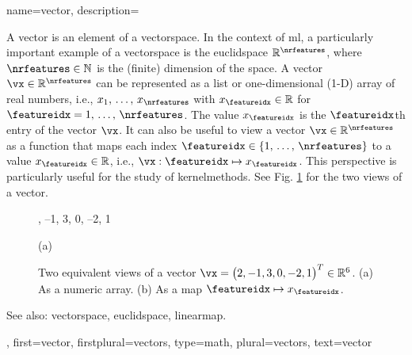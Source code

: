 {name={vector},
	description={A vector is an element of a \gls{vectorspace}. 
		In the context of \gls{ml}, a particularly important example of a \gls{vectorspace} 
		is the \gls{euclidspace} $\mathbb{R}^{\nrfeatures}$, where $\nrfeatures \in \mathbb{N}$ 
		is the (finite) dimension of the space. A vector $\vx \in \mathbb{R}^{\nrfeatures}$ 
		can be represented as a list or one-dimensional (1-D) array of real numbers, i.e., 
		$x_1, \,\ldots, \,x_{\nrfeatures}$ with $x_\featureidx \in \mathbb{R}$ for 
		$\featureidx = 1, \,\ldots, \,\nrfeatures$. The value $x_\featureidx$ is the $\featureidx$th 
		entry of the vector $\vx$. It can also be useful to view a vector $\vx \in \mathbb{R}^{\nrfeatures}$ 
		as a \gls{function} that maps each index $\featureidx \in \{1, \,\ldots, \,\nrfeatures\}$ 
		to a value $x_\featureidx \in \mathbb{R}$, i.e., $\vx: \featureidx \mapsto x_\featureidx$. 
		This perspective is particularly useful for the study of \glspl{kernelmethod}. See Fig. 
		\ref{fig:vector-function-dual_dict} for the two views of a vector.
		\begin{figure}[H]
			\begin{minipage}[c]{0.48\textwidth}
				, --1, 3, 0, --2, 1
				\begin{minipage}{\textwidth}
				\vspace{5ex}
				\centering
				{\selectfont (a)}
				\end{minipage}
			\end{minipage}
			\hfill
			\begin{minipage}{0.48\textwidth}
			\centering
			\end{minipage}
			\caption{Two equivalent views of a vector $\vx= \big( 2, -1, 3, 0, -2, 1 \big)^{T} \in \mathbb{R}^{6}$.
			(a) As a numeric array. (b) As a \gls{map} $\featureidx \mapsto x_\featureidx$.}
			\label{fig:vector-function-dual_dict}
		\end{figure}
		See also: \gls{vectorspace}, \gls{euclidspace}, \gls{linearmap}.},
	first={vector},
	firstplural={vectors},
	type=math,
	plural={vectors},
	text={vector}
}



